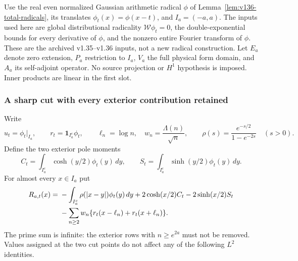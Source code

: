 \documentclass[11pt]{article}
\theoremstyle{remark}
\begin{document}
Use the real even normalized Gaussian arithmetic radical $\phi$ of
Lemma~\ref{lem:v136-total-radicals}, its translates
$\phi_t(x)=\phi(x-t)$, and $I_a=(-a,a)$. The inputs used here are
global distributional radicality $\mathcal W\phi_t=0$, the
double-exponential bounds for every derivative of $\phi$, and the
nonzero entire Fourier transform of $\phi$. These are the archived
v1.35--v1.36 inputs, not a new radical construction. Let $E_a$ denote
zero extension, $P_a$ restriction to $I_a$, $V_a$ the full physical
form domain, and $A_a$ its self-adjoint operator. No source projection
or $H^1$ hypothesis is imposed. Inner products are linear in the first slot.

\subsubsection*{A sharp cut with every exterior contribution retained}

Write
\[
 u_t=\phi_t|_{I_a},\qquad r_t=\mathbf1_{I_a^c}\phi_t,
 \qquad \ell_n=\log n,\quad w_n=\frac{\Lambda(n)}{\sqrt n},
 \qquad \rho(s)=\frac{e^{-s/2}}{1-e^{-2s}}\quad(s>0).
\]
Define the two exterior pole moments
\[
 C_t=\int_{I_a^c}\cosh(y/2)\phi_t(y)\,dy,\qquad
 S_t=\int_{I_a^c}\sinh(y/2)\phi_t(y)\,dy.
\]
For almost every $x\in I_a$ put
\begin{align}
 R_{a,t}(x)={}&-\int_{I_a^c}\rho(|x-y|)\phi_t(y)\,dy
       +2\cosh(x/2)C_t-2\sinh(x/2)S_t\notag\\
 &-\sum_{n\ge2}w_n\{r_t(x-\ell_n)+r_t(x+\ell_n)\}.
 \label{eq:ns58-exterior-row}
\end{align}
The prime sum is infinite: the exterior rows with $n\ge e^{2a}$
must not be removed. Values assigned at the two cut points do not
affect any of the following $L^2$ identities.
\end{document}
